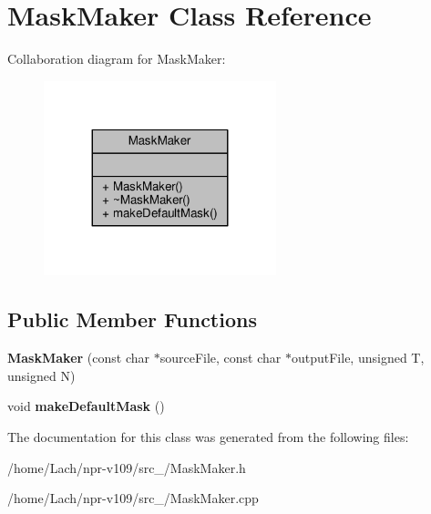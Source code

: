 \hypertarget{classMaskMaker}{}\section{Mask\+Maker Class Reference}
\label{classMaskMaker}


Collaboration diagram for Mask\+Maker\+:
\nopagebreak
\begin{figure}[H]
\begin{center}
\leavevmode
\includegraphics[width=191pt]{classMaskMaker__coll__graph}
\end{center}
\end{figure}
\subsection*{Public Member Functions}
\begin{DoxyCompactItemize}
\item 
\hypertarget{classMaskMaker_a94e5e9132a4dd3e4e1d8d1cdc8e0fcd2}{}\label{classMaskMaker_a94e5e9132a4dd3e4e1d8d1cdc8e0fcd2} 
{\bfseries Mask\+Maker} (const char $\ast$source\+File, const char $\ast$output\+File, unsigned T, unsigned N)
\item 
\hypertarget{classMaskMaker_a0fe6264b064fa722664f2eefb73af9e1}{}\label{classMaskMaker_a0fe6264b064fa722664f2eefb73af9e1} 
void {\bfseries make\+Default\+Mask} ()
\end{DoxyCompactItemize}


The documentation for this class was generated from the following files\+:\begin{DoxyCompactItemize}
\item 
/home/\+Lach/npr-\/v109/src\+\_/Mask\+Maker.\+h\item 
/home/\+Lach/npr-\/v109/src\+\_/Mask\+Maker.\+cpp\end{DoxyCompactItemize}

